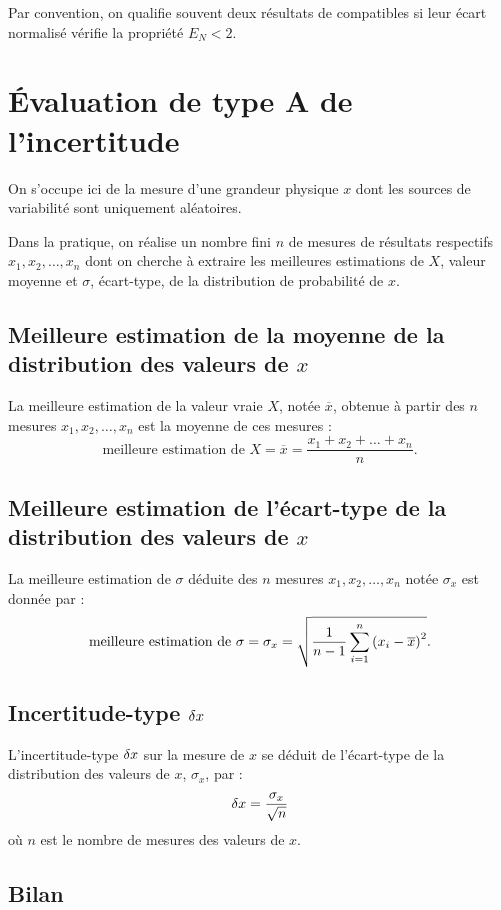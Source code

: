 Par convention, on qualifie souvent deux résultats de compatibles si leur écart normalisé vérifie la propriété \(E_N<2\).

\section{Évaluation de type A de l'incertitude}

On s'occupe ici de la mesure d'une grandeur physique \(x\) dont les sources de variabilité sont uniquement aléatoires.

Dans la pratique, on réalise un nombre fini \(n\) de mesures de résultats respectifs \(x_1,x_2,\ldots,x_n\) dont on cherche à extraire les meilleures estimations de \(X\), valeur moyenne et \(\sigma\), écart-type, de la distribution de probabilité de \(x\).

\subsection{Meilleure estimation de la moyenne de la distribution des valeurs de \(x\)}

La meilleure estimation de la valeur vraie \(X\), notée \(\overline{x}\), obtenue à partir des \(n\) mesures \(x_1,x_2,\ldots,x_n\) est la moyenne de ces mesures : \[\text{meilleure estimation de }X=\overline{x}=\dfrac{x_1+x_2+\ldots+x_n}{n}.\]

\subsection{Meilleure estimation de l'écart-type de la distribution des valeurs de \(x\)}

La meilleure estimation de \(\sigma\) déduite des \(n\) mesures \(x_1,x_2,\ldots,x_n\) notée \(\sigma_x\) est donnée par : \[\text{meilleure estimation de }\sigma=\sigma_x=\sqrt{\dfrac{1}{n-1}\sum_{i=1}^n\left(x_i-\overline{x}\right)^2}.\]

\subsection{Incertitude-type \(\fdif{x}\)}

L'incertitude-type \(\fdif{x}\) sur la mesure de \(x\) se déduit de l'écart-type de la distribution des valeurs de \(x\), \(\sigma_x\), par : \[\fdif{x}=\dfrac{\sigma_x}{\sqrt{n}}\] où \(n\) est le nombre de mesures des valeurs de \(x\).

\subsection{Bilan}

